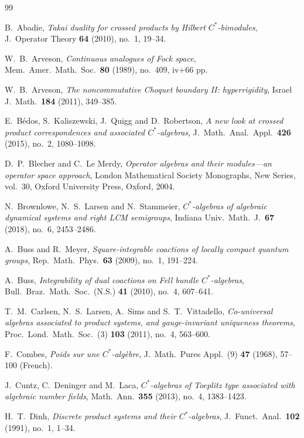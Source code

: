 \documentclass[11pt,final]{amsart}
\numberwithin{equation}{section}
\theoremstyle{plain}
\theoremstyle{definition}
\theoremstyle{remark}
\begin{document}
\begin{thebibliography}{99}

B.\ Abadie,
\textit{Takai duality for crossed products by Hilbert $C^*$-bimodules},
J.\ Operator Theory \textbf{64} (2010), no.\ 1, 19--34.

W.\ B.\ Arveson,
\textit{Continuous analogues of Fock space},
Mem.\ Amer.\ Math.\ Soc.\ \textbf{80} (1989), no.\ 409, iv+66 pp.

W.\ B.\ Arveson,
\textit{The noncommutative Choquet boundary II: hyperrigidity},
Israel J.\ Math.\ \textbf{184} (2011), 349--385.

E.\ B\'edos, S.\ Kaliszewski, J.\ Quigg and D.\ Robertson,
\textit{A new look at crossed product correspondences and associated
$C^*$-algebras},
J.\ Math.\ Anal.\ Appl.\ \textbf{426} (2015), no.\ 2, 1080--1098.

D.\ P.\ Blecher and C.\ Le Merdy,
\textit{Operator algebras and their modules---an operator space approach},
London Mathematical Society Monographs, New Series, vol.\ 30,
Oxford University Press, Oxford, 2004.

N.\ Brownlowe, N.\ S.\ Larsen and N.\ Stammeier,
\textit{$C^*$-algebras of algebraic dynamical systems and right LCM semigroups},
Indiana Univ.\ Math.\ J.\ \textbf{67} (2018), no.\ 6, 2453--2486.

A.\ Buss and R.\ Meyer,
\textit{Square-integrable coactions of locally compact quantum groups},
Rep.\ Math.\ Phys.\ \textbf{63} (2009), no.\ 1, 191--224.

A.\ Buss,
\textit{Integrability of dual coactions on Fell bundle $C^*$-algebras},
Bull.\ Braz.\ Math.\ Soc.\ (N.S.) \textbf{41} (2010), no.\ 4, 607--641.

T.\ M.\ Carlsen, N.\ S.\ Larsen, A.\ Sims and S.\ T.\ Vittadello,
\textit{Co-universal algebras associated to product systems, and
gauge-invariant uniqueness theorems},
Proc.\ Lond.\ Math.\ Soc.\ (3) \textbf{103} (2011), no.\ 4, 563--600.

F.\ Combes,
\textit{Poids sur une $C^*$-alg\`ebre},
J.\ Math.\ Pures Appl.\ (9) \textbf{47} (1968), 57--100 (French).

J.\ Cuntz, C.\ Deninger and M.\ Laca,
\textit{$C^*$-algebras of Toeplitz type associated with algebraic number fields},
Math.\ Ann.\ \textbf{355} (2013), no.\ 4, 1383--1423.

H.\ T.\ Dinh,
\textit{Discrete product systems and their $C^*$-algebras},
J.\ Funct.\ Anal.\ \textbf{102} (1991), no.\ 1, 1--34.


\end{thebibliography}
\end{document}
